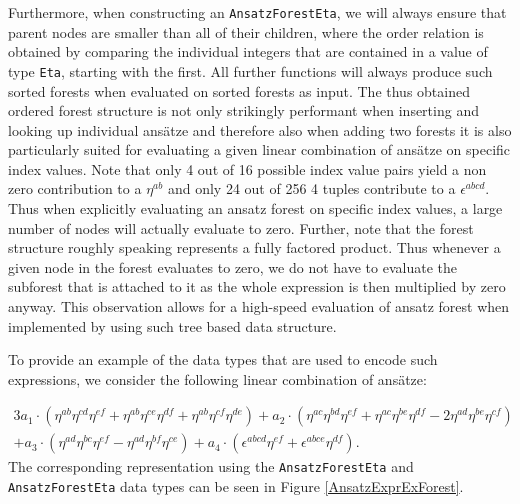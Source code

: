 \documentclass[a4paper,12pt, DIV=14, BCOR=5mm, twoside, headsepline, numbers=noenddot]{scrbook}
\begin{document}
Furthermore, when constructing an \texttt{AnsatzForestEta}, we will always ensure that parent nodes are smaller than all of their children, where the order relation is obtained by comparing the individual integers that are contained in a value of type \texttt{Eta}, starting with the first. All further functions will always produce such sorted forests when evaluated on sorted forests as input. 
The thus obtained ordered forest structure is not only strikingly performant when inserting and looking up individual ansätze and therefore also when adding two forests it is also particularly suited for evaluating a given linear combination of ansätze on specific index values. Note that only 4 out of 16 possible index value pairs yield a non zero contribution to a $\eta^{ab}$ and only 24 out of 256 4 tuples contribute to a $\epsilon^{abcd}$. Thus when explicitly evaluating an ansatz forest on specific index values, a large number of nodes will actually evaluate to zero. Further, note that the forest structure roughly speaking represents a fully factored product. Thus whenever a given node in the forest evaluates to zero, we do not have to evaluate the subforest that is attached to it as the whole expression is then multiplied by zero anyway. This observation allows for a high-speed evaluation of ansatz forest when implemented by using such tree based data structure. 

To provide an example of the data types that are used to encode such expressions, we consider the following linear combination of ansätze:

\begin{multline}\label{AnsatzExprEx}
3a_1 \cdot \left (\eta^{ab}\eta^{cd}\eta^{ef} + \eta^{ab}\eta^{ce}\eta^{df} + \eta^{ab}\eta^{cf}\eta^{de} \right ) + a_2 \cdot \left ( \eta^{ac} \eta^{bd} \eta^{ef} + \eta^{ac} \eta^{be} \eta^{df} -2 \eta^{ad} \eta^{be} \eta^{cf} \right ) \\
+ a_3 \cdot \left ( \eta^{ad} \eta^{bc} \eta^{ef} - \eta^{ad} \eta^{bf} \eta^{ce} \right ) + a_4 \cdot \left ( \epsilon^{abcd} \eta^{ef} + \epsilon^{abce} \eta^{df}  \right )   .
\end{multline}
The corresponding representation using the \texttt{AnsatzForestEta} and \texttt{AnsatzForestEta} data types can be seen in Figure \ref{AnsatzExprExForest}.
\end{document}

